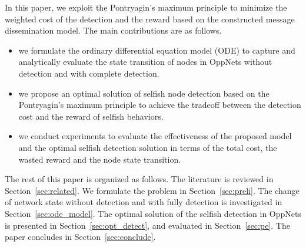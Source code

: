 In this paper, we exploit the Pontryagin's maximum principle to
minimize the weighted cost of the detection and the reward
based on the constructed message dissemination model.
The main contributions are as follows.

\begin{itemize}
\item {we formulate the ordinary differential equation model (ODE)
to capture and analytically evaluate the state transition of nodes
in OppNets without detection and with complete detection.}
\item {we propose an optimal solution of selfish node detection
based on the Pontryagin's maximum principle
to achieve the tradeoff between the detection cost
and the reward of selfish behaviors.}
\item {we conduct experiments to evaluate
the effectiveness of the proposed model
and the optimal selfish detection solution
in terms of the total cost, the wasted reward and the node state transition.}
\end{itemize}

The rest of this paper is organized as follows.
The literature is reviewed in Section~\ref{sec:related}.
We formulate the problem in Section~\ref{sec:preli}.
The change of network state without detection and with fully detection
is investigated in Section~\ref{sec:ode_model}.
The optimal solution of the selfish detection in OppNets
is presented in Section~\ref{sec:opt_detect},
and evaluated in Section~\ref{sec:pe}.
The paper concludes in Section~\ref{sec:conclude}.
